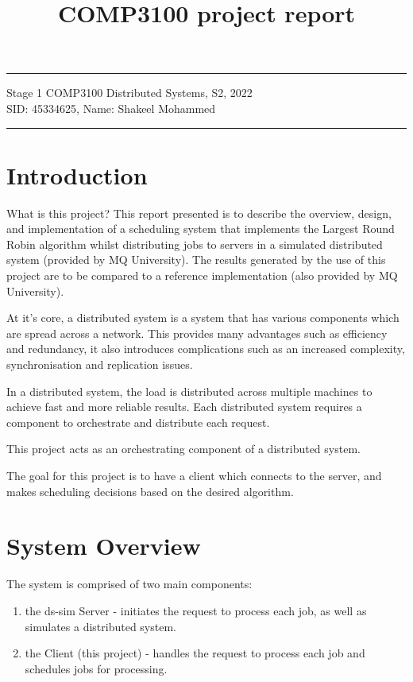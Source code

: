 \documentclass[a4paper]{article}
\begin{document}
\title{COMP3100 project report}
\hrule \medskip
\begin{minipage}{0.9\textwidth}
\centering 
\large
Stage 1 COMP3100 Distributed Systems, S2, 2022\\
\normalsize
SID: 45334625, Name: Shakeel Mohammed
\end{minipage}
\medskip\hrule
\bigskip

\section{Introduction}
What is this project?
This report presented is to describe the overview, design, and implementation of a scheduling system that implements the Largest Round Robin algorithm whilst distributing jobs to servers in a simulated distributed system (provided by MQ University). The results generated by the use of this project are to be compared to a reference implementation (also provided by MQ University).

At it's core, a distributed system is a system that has various components which are spread across a network. This provides many advantages such as efficiency and redundancy, it also introduces complications such as an increased complexity, synchronisation and replication issues.

In a distributed system, the load is distributed across multiple machines to achieve fast and more reliable results. Each distributed system requires a component to orchestrate and distribute each request.

This project acts as an orchestrating component of a distributed system.

The goal for this project is to have a client which connects to the server, and makes scheduling decisions based on the desired algorithm.

\section{System Overview}
\label{sec:section2}
The system is comprised of two main components:
\begin{enumerate}
  \item the ds-sim Server - initiates the request to process each job, as well as simulates a distributed system.
  \item the Client (this project) - handles the request to process each job and schedules jobs for processing.
\end{enumerate}
\end{document}
